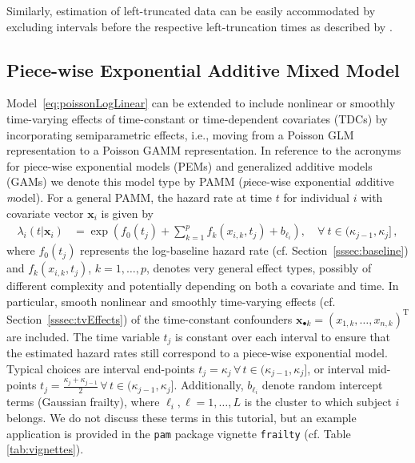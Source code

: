 \documentclass[submit]{smj}
\newcommand{\bfx}{\mathbf{x}}
\newcommand{\code}[1]{{\small \texttt{#1}}}
\def\T{{ \mathrm{\scriptscriptstyle T} }}
\begin{document}
Similarly, estimation of left-truncated data can be easily accommodated by
excluding intervals before the respective left-truncation times as described
by \cite{Guo1993}.

\subsection{Piece-wise Exponential Additive Mixed Model}\label{ssec:pam}
Model~\eqref{eq:poissonLogLinear} can be extended to include nonlinear or
smoothly time-varying effects of time-constant or time-dependent covariates (TDCs)
by incorporating semiparametric effects, i.e., moving from a Poisson GLM
representation to a Poisson GAMM representation. In reference to the acronyms for
piece-wise exponential models (PEMs) and generalized additive models (GAMs) we
denote this model type by %
PAMM (\emph{p}iece-wise exponential \emph{a}dditive \emph{m}odel).
For a general PAMM, the hazard rate at time $t$ for individual $i$ with covariate
vector $\bfx_i$ is given by
\begin{align}\label{eq:pam}
  \lambda_i(t|\bfx_i)
    & = \exp
    \left(
      f_0(t_j) + \sum_{k=1}^p f_k(x_{i,k}, t_j) + b_{\ell_i}
    \right),\quad \forall\ t\in (\kappa_ {j-1}, \kappa_j]\,,
\end{align}
where $f_0(t_j)$ represents the log-baseline hazard rate (cf. Section~\ref{sssec:baseline}) and $f_k(x_{i,k}, t_j)$, $k=1,\ldots,p$, denotes very general effect types, possibly of different complexity and potentially depending on both a covariate and time. In particular, smooth
nonlinear and smoothly time-varying effects (cf. Section~\ref{sssec:tvEffects}) of
the time-constant confounders $\bfx_{\bullet k}=(x_{1,k},\ldots,x_{n,k})^{\T}$ are included.
The time variable $t_j$ is constant over each interval to ensure that
the estimated hazard rates still correspond to a piece-wise exponential model.
Typical choices are interval end-points $t_j = \kappa_j\,\forall\, t \in (\kappa_{j-1}, \kappa_j]$, or
interval mid-points $t_j = \frac{\kappa_j + \kappa_{j-1}}{2} \,\forall\, t \in (\kappa_{j-1}, \kappa_j]$.
Additionally, $b_{\ell_i}$ denote random intercept terms (Gaussian frailty),
where $\ell_i,\ell=1,\ldots, L$ is the cluster to which subject $i$ belongs.
We do not discuss these terms in this tutorial, but an example application is
provided in the \code{pam} package vignette \code{frailty} (cf. Table
\ref{tab:vignettes}).
\end{document}
